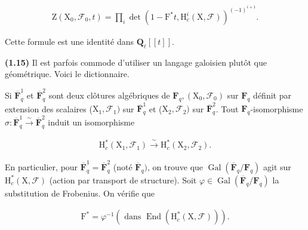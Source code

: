 \documentclass[10pt,leqno]{article}
\begin{document}
\begin{equation*}\begin{gathered}\mathrm{Z}(\mathrm{X}_{0},\mathcal{F} _{0},t) = \prod _{i} \operatorname{det}(1- \mathrm{F}^{*}t,\mathrm{H}_{c}^{i}(\mathrm{X},\mathcal{F} ))^{(- 1)^{i+1}}.\end{gathered}\tag{1.14.3}\end{equation*}

\noindent Cette formule est une identité dans \(\mathbf{Q}_{\ell }[[t]]\).\par

\noindent \textbf{(1.15)} Il est parfois commode d’utiliser un langage galoisien plutôt que géométrique. Voici le dictionnaire.\par

\noindent Si \(\overline{\mathbf{F}}_{q}^{1}\) et \(\overline{\mathbf{F}}_{q}^{2}\) sont deux clôtures algébriques de \(\mathbf{F}_{q}, (\mathrm{X}_{0},\mathcal{F} _{0})\) sur \(\mathbf{F}_{q}\) définit par extension des scalaires (\(\mathrm{X}_{1},\mathcal{F} _{1})\) sur \(\overline{\mathbf{F}}_{q}^{1}\) et (\(\mathrm{X}_{2},\mathcal{F} _{2})\) sur \(\overline{\mathbf{F}}_{q}^{2}\). Tout \(\mathbf{F}_{q}\)-isomorphisme \(\sigma  : \overline{\mathbf{F}}_{q}^{1} \xrightarrow{\sim } \overline{\mathbf{F}}_{q}^{2}\) induit un isomorphisme\par

\begin{equation*}\begin{gathered}\mathrm{H}_{c}^{*}(\mathrm{X}_{1},\mathcal{F} _{1}) \xrightarrow{\sim } \mathrm{H}_{c}^{*}(\mathrm{X}_{2},\mathcal{F} _{2}).\end{gathered}\end{equation*}

\noindent En particulier, pour \(\overline{\mathbf{F}}_{q}^{1}=\overline{\mathbf{F}}_{q}^{2}\) (noté \(\overline{\mathbf{F}}_{q})\), on trouve que \(\operatorname{Gal}(\overline{\mathbf{F}}_{q}/\mathbf{F}_{q})\) agit sur \(\mathrm{H}_{c}^{*}(\mathrm{X},\mathcal{F} )\) (action par transport de structure). Soit \(\varphi \in \operatorname{Gal}(\overline{\mathbf{F}}_{q}/\mathbf{F}_{q})\) la substitution de Frobenius. On vérifie que\par

\begin{equation*}\begin{gathered}\mathrm{F}^{*} = \varphi ^{- 1}    (\text{ dans }\operatorname{End}(\mathrm{H}_{c}^{*}(\mathrm{X},\mathcal{F} ))).\end{gathered}\end{equation*}
\end{document}
